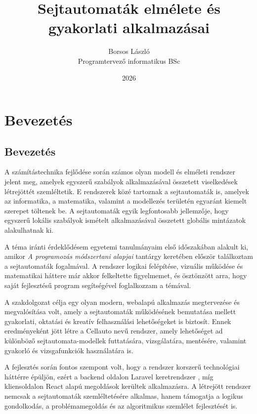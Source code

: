 \documentclass{thesis-ekf}
\begin{document}
\title{Sejtautomaták elmélete és gyakorlati alkalmazásai}
\author{Borsos László\\Programtervező informatikus BSc}
\date{2026}
\maketitle

\tableofcontents
\listoffigures
\listoftables

\chapter{Bevezetés}

\section{Bevezetés}
A számítástechnika fejlődése során számos olyan modell és elméleti rendszer jelent meg, amelyek egyszerű szabályok alkalmazásával összetett viselkedések létrejöttét szemléltetik. E rendszerek közé tartoznak a sejtautomaták is, amelyek az informatika, a matematika, valamint a modellezés területén egyaránt kiemelt szerepet töltenek be. A sejtautomaták egyik legfontosabb jellemzője, hogy egyszerű lokális szabályok ismételt alkalmazásával összetett globális mintázatok alakulhatnak ki.

A téma iránti érdeklődésem egyetemi tanulmányaim első időszakában alakult ki, amikor \emph{A programozás módszertani alapjai} tantárgy keretében először találkoztam a sejtautomaták fogalmával. A rendszer logikai felépítése, vizuális működése és matematikai háttere már akkor felkeltette figyelmemet, és ösztönzött arra, hogy saját fejlesztésű program segítségével foglalkozzam a témával.

A szakdolgozat célja egy olyan modern, webalapú alkalmazás megtervezése és megvalósítása volt, amely a sejtautomaták működésének bemutatása mellett gyakorlati, oktatási és kreatív felhasználási lehetőségeket is biztosít. Ennek eredményeként jött létre a Cellauto nevű rendszer, amely lehetőséget ad különböző sejtautomata-modellek futtatására, vizsgálatára, mentésére, valamint gyakorló és vizsgafunkciók használatára is.

A fejlesztés során fontos szempont volt, hogy a rendszer korszerű technológiai háttérre épüljön, ezért a backend oldalon Laravel keretrendszer \cite{laravel}, míg kliensoldalon React alapú megoldások \cite{react} kerültek alkalmazásra. A létrejött rendszer nemcsak a sejtautomaták szemléltetésére alkalmas, hanem támogatja a logikus gondolkodás, a problémamegoldás és az algoritmikus szemlélet fejlesztését is.
\end{document}
